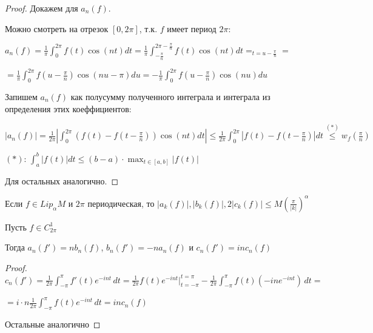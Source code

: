 \begin{proof}

    Докажем для $a_n(f)$.

    Можно смотреть на отрезок $[0, 2\pi]$, т.к. $f$ имеет период $2\pi$:

    $a_n(f) = \frac{1}{\pi} \int_{0}^{2\pi} f(t) \cos(nt) dt = \frac{1}{\pi} \int_{-\frac{\pi}{n}}^{2\pi - \frac{\pi}{n}} f(t) \cos(nt) dt =_{t = u - \frac{\pi}{n}} = $

    $= \frac{1}{\pi} \int_{0}^{2\pi} f(u - \frac{\pi}{n}) \cos(nu - \pi) du = -\frac{1}{\pi} \int_{0}^{2\pi} f(u - \frac{\pi}{n}) \cos(n u) du$

    Запишем $a_n(f)$ как полусумму полученного интеграла и интеграла из определения этих коеффициентов:

    $|a_n(f)| = \frac{1}{2\pi} \left| \int_{0}^{2\pi} (f(t) - f(t - \frac{\pi}{n})) \cos(nt) dt \right| \leq \frac{1}{2 \pi} \int_{0}^{2\pi} | f(t) - f(t - \frac{\pi}{n}) | dt \overset{(*)}{\leq} w_{f}(\frac{\pi}{n})$

    $(*)$: $\int_{a}^{b} |f(t)| dt \leq (b - a) \cdot \max_{t \in [a, b]} |f(t)|$



    Для остальных аналогично.
\end{proof}

\begin{consequence}
    Если $f \in Lip_\alpha M$ и $2\pi$ периодическая, то
    $|a_k (f)|, |b_k(f) |, 2| c_k(f) | \leqslant M \left (\frac{\pi}{|k|} \right )^\alpha$
\end{consequence}

\begin{lemma}
    Пусть $f \in C_{2\pi}^1$

    Тогда $a_n (f') = n b_n (f)$, $b_n (f') = -n a_n (f)$ и $c_n (f') = in c_n (f)$
\end{lemma}

\begin{proof}
    $c_n (f') = \frac{1}{2\pi} \int_{-\pi}^\pi f'(t) e^{-int} \, dt = \frac{1}{2\pi} f(t) e^{-int} \bigg |_{t = -\pi}^{t = \pi} - \frac{1}{2\pi} \int_{-\pi}^\pi f (t) (-ine^{-int}) \, dt = $
    
    $=i \cdot n \frac{1}{2\pi} \int_{-\pi}^\pi f(t) e^{-int} \, dt = in c_n (f)$

    Остальные аналогично
\end{proof}

